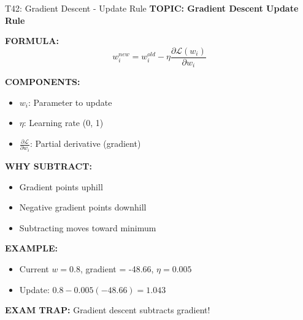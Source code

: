 \documentclass[8pt]{beamer}
\begin{document}
	\begin{frame}{T42: Gradient Descent - Update Rule}
		\fontsize{6.5}{7.5}\selectfont
		\textbf{TOPIC: Gradient Descent Update Rule}
		
		\vspace{0.1cm}
		\textbf{FORMULA:}
		\[
		w_i^{new} = w_i^{old} - \eta \frac{\partial \mathcal{L}(w_i)}{\partial w_i}
		\]
		
		\vspace{0.1cm}
		\textbf{COMPONENTS:}
		\begin{itemize}
			\item $w_i$: Parameter to update
			\item $\eta$: Learning rate (0, 1)
			\item $\frac{\partial \mathcal{L}}{\partial w_i}$: Partial derivative (gradient)
		\end{itemize}
		
		\vspace{0.1cm}
		\textbf{WHY SUBTRACT:}
		\begin{itemize}
			\item Gradient points uphill
			\item Negative gradient points downhill
			\item Subtracting moves toward minimum
		\end{itemize}
		
		\vspace{0.1cm}
		\textbf{EXAMPLE:}
		\begin{itemize}
			\item Current $w = 0.8$, gradient = -48.66, $\eta = 0.005$
			\item Update: $0.8 - 0.005(-48.66) = 1.043$
		\end{itemize}
		
		\textcolor{myred}{\textbf{EXAM TRAP:}} Gradient descent \textcolor{myblue}{subtracts} gradient!
	\end{frame}
	
\end{document}
